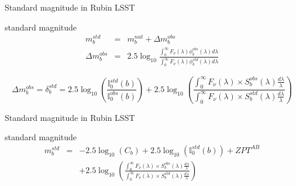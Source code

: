 \documentclass{beamer}
\begin{document}
\begin{frame}{Standard magnitude in Rubin LSST}
\begin{alertblock}{standard magnitude}
\begin{eqnarray}
m_b^{std} & = & m_b^{nat} + \Delta m_b^{obs} \\
\Delta m_b^{obs} & = & 2.5 \log_{10} \frac{\int_0^\infty F_\nu(\lambda) \phi_b^{obs}(\lambda) d\lambda}{\int_0^\infty F_\nu(\lambda) \phi_b^{std}(\lambda) d\lambda}
\end{eqnarray}
\end{alertblock}
\begin{block}{}
\begin{equation}
\Delta m_b^{obs} = \delta_b^{std} =  2.5 \log_{10}\left( \frac{\mathbb{I}_0^{std}(b)}{\mathbb{I}_0^{obs}(b)}\right) 
+ 2.5 \log_{10} 
	\left( 
	\frac{\int_0^\infty F_\nu(\lambda) \times S_b^{obs}(\lambda) \frac{d\lambda}{\lambda} }{\int_0^\infty F_\nu(\lambda) \times S_b^{std}(\lambda) \frac{d\lambda}{\lambda}} 
	\right)
\end{equation}
\end{block}
\end{frame}


\begin{frame}{Standard magnitude in Rubin LSST}
\begin{alertblock}{standard magnitude}
\begin{eqnarray}
m_b^{std} & = &  -2.5 \log_{10}(C_b)+ 2.5 \log_{10}\left(\mathbb{I}_0^{std}(b)\right) + ZPT^{AB}   \nonumber \\
 & & + 2.5 \log_{10} 
	\left( 
	\frac{\int_0^\infty F_\nu(\lambda) \times S_b^{obs}(\lambda) \frac{d\lambda}{\lambda} }{\int_0^\infty F_\nu(\lambda) \times S_b^{std}(\lambda) \frac{d\lambda}{\lambda}} 
	\right)
\end{eqnarray}
\end{alertblock}
\end{frame}
\end{document}
